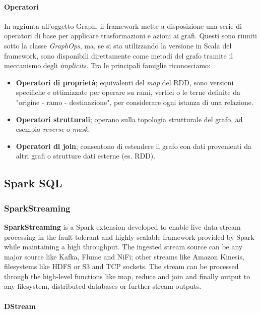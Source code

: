 \paragraph{Operatori}
In aggiunta all'oggetto Graph, il framework mette a disposizione una serie di operatori di base per applicare trasformazioni e azioni ai grafi. Questi sono riuniti sotto la classe \textit{GraphOps}, ma, se si sta utilizzando la versione in Scala del framework, sono disponibili direttamente come metodi del grafo tramite il meccanismo degli \textit{implicits}. Tra le principali famiglie riconosciamo:
\begin{itemize}
	\item \textbf{Operatori di proprietà}; equivalenti del \textit{map} del RDD, sono versioni specifiche e ottimizzate per operare su rami, vertici o le terne definite da "origine - ramo - destinazione", per considerare ogni istanza di una relazione.
	\item \textbf{Operatori strutturali}; operano sulla topologia strutturale del grafo, ad esempio \textit{reverse} o \textit{mask}.
	\item \textbf{Operatori di join}; consentono di estendere il grafo con dati provenienti da altri grafi o strutture dati esterne (es. RDD).
\end{itemize}

\subsection{Spark SQL}


\subsubsection{SparkStreaming}

\textbf{SparkStreaming} is a Spark extension developed to enable live data stream processing in the fault-tolerant and highly scalable framework provided by Spark while maintaining a high throughput.
The ingested stream source can be any major source like Kafka, Flume and NiFi; other streams like Amazon Kinesis, filesystems like HDFS or S3 and TCP sockets.
The stream can be processed through the high-level functions like map, reduce and join and finally output to any filesystem, distributed databases or further stream outputs.

\paragraph{DStream}

